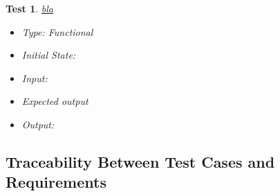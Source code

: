 \documentclass[12pt, titlepage]{article}
\newtheorem{Test}{Test}
\begin{document}
\begin{Test}\normalfont\underline{bla}
\begin{itemize}
\item Type: Functional
\item Initial State:
\item Input: 
\item Expected output
\item Output:  
\end{itemize}
\end{Test}	

\subsection{Traceability Between Test Cases and Requirements}


		



					
					
					
					
					

					
					
					
					
\end{document}
